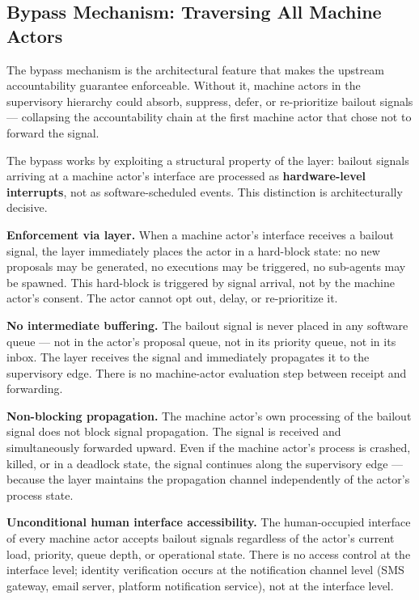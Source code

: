 \subsection{Bypass Mechanism: Traversing All Machine Actors}
\label{sec:bypass-mechanism}

The bypass mechanism is the architectural feature that makes the \bxthree{} upstream accountability guarantee enforceable. Without it, machine actors in the supervisory hierarchy could absorb, suppress, defer, or re-prioritize bailout signals — collapsing the accountability chain at the first machine actor that chose not to forward the signal.

The bypass works by exploiting a structural property of the \fact{} layer: bailout signals arriving at a machine actor's \fact{} interface are processed as \textbf{hardware-level interrupts}, not as software-scheduled events. This distinction is architecturally decisive.

\bigskip
\noindent\textbf{Enforcement via \fact{} layer.} When a machine actor's \fact{} interface receives a bailout signal, the \fact{} layer immediately places the actor in a hard-block state: no new proposals may be generated, no executions may be triggered, no sub-agents may be spawned. This hard-block is triggered by signal arrival, not by the machine actor's consent. The actor cannot opt out, delay, or re-prioritize it.

\bigskip
\noindent\textbf{No intermediate buffering.} The bailout signal is never placed in any software queue — not in the actor's proposal queue, not in its priority queue, not in its inbox. The \fact{} layer receives the signal and immediately propagates it to the supervisory edge. There is no machine-actor evaluation step between receipt and forwarding.

\bigskip
\noindent\textbf{Non-blocking propagation.} The machine actor's own processing of the bailout signal does not block signal propagation. The signal is received and simultaneously forwarded upward. Even if the machine actor's process is crashed, killed, or in a deadlock state, the signal continues along the supervisory edge — because the \fact{} layer maintains the propagation channel independently of the actor's process state.

\bigskip
\noindent\textbf{Unconditional human interface accessibility.} The human-occupied interface of every machine actor accepts bailout signals regardless of the actor's current load, priority, queue depth, or operational state. There is no access control at the interface level; identity verification occurs at the notification channel level (SMS gateway, email server, platform notification service), not at the interface level.

